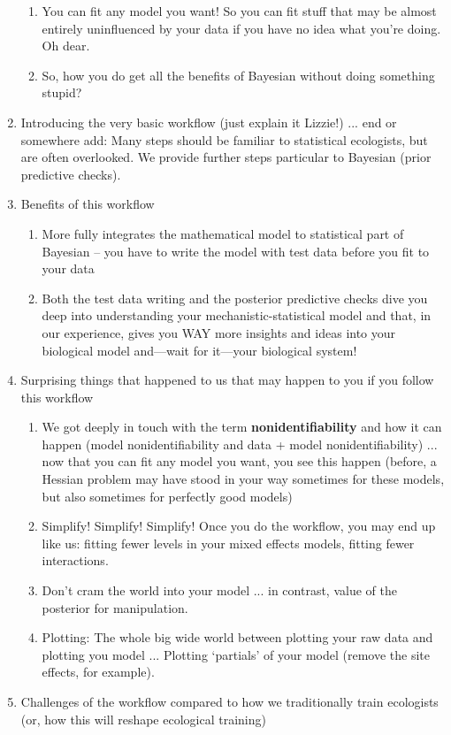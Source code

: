 \documentclass[11pt]{article}
\begin{document}
\begin{enumerate}
\begin{enumerate}
\item You can fit any model you want! So you can fit stuff that may be almost entirely uninfluenced by your data if you have no idea what you're doing. Oh dear.
\item So, how you do get all the benefits of Bayesian without doing something stupid?  
\end{enumerate}
\item Introducing the very basic workflow (just explain it Lizzie!) ... end or somewhere add: Many steps should be familiar to statistical ecologists, but are often overlooked. We provide further steps particular to Bayesian (prior predictive checks).
\item Benefits of this workflow
\begin{enumerate}
\item More fully integrates the mathematical model to statistical part of Bayesian -- you have to write the model with test data before you fit to your data
\item Both the test data writing and the posterior predictive checks dive you deep into understanding your mechanistic-statistical model and that, in our experience, gives you WAY more insights and ideas into your biological model and---wait for it---your biological system!
\end{enumerate}
\item Surprising things that happened to us that may happen to you if you follow this workflow
\begin{enumerate}
\item We got deeply in touch with the term {\bf nonidentifiability} and how it can happen (model nonidentifiability and data + model nonidentifiability) ... now that you can fit any model you want, you see this happen (before, a Hessian problem may have stood in your way sometimes for these models, but also sometimes for perfectly good models)
\item Simplify! Simplify! Simplify! Once you do the workflow, you may end up like us: fitting fewer levels in your mixed effects models, fitting fewer interactions.
\item Don't cram the world into your model ... in contrast, value of the posterior for manipulation. 
\item Plotting: The whole big wide world between plotting your raw data and plotting you model ... Plotting `partials' of your model (remove the site effects, for example).
\end{enumerate}
\item Challenges of the workflow compared to how we traditionally train ecologists (or, how this will reshape ecological training)

\end{enumerate}
\end{document}

